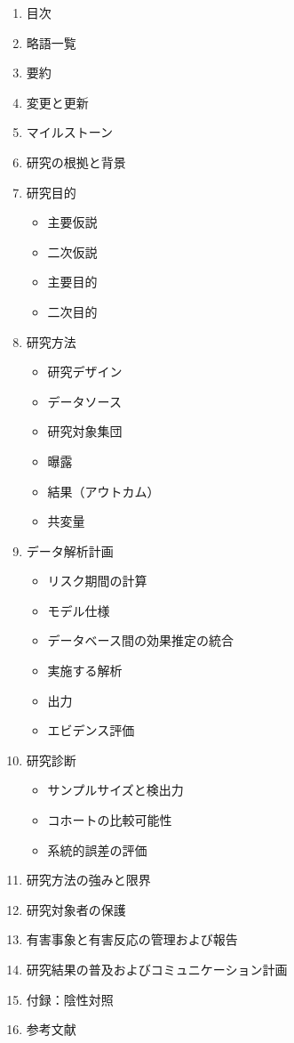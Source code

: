 \documentclass[
  11pt]{book}
\providecommand{\tightlist}{%
  \setlength{\itemsep}{0pt}\setlength{\parskip}{0pt}}
\theoremstyle{definition}
\theoremstyle{definition}
\theoremstyle{definition}
\theoremstyle{definition}
\theoremstyle{remark}
\begin{document}
\begin{enumerate}
\def\labelenumi{\arabic{enumi}.}
\tightlist
\item
  目次
\item
  略語一覧
\item
  要約
\item
  変更と更新
\item
  マイルストーン
\item
  研究の根拠と背景
\item
  研究目的

  \begin{itemize}
  \tightlist
  \item
    主要仮説
  \item
    二次仮説
  \item
    主要目的
  \item
    二次目的
  \end{itemize}
\item
  研究方法

  \begin{itemize}
  \tightlist
  \item
    研究デザイン
  \item
    データソース
  \item
    研究対象集団
  \item
    曝露
  \item
    結果（アウトカム）
  \item
    共変量
  \end{itemize}
\item
  データ解析計画

  \begin{itemize}
  \tightlist
  \item
    リスク期間の計算
  \item
    モデル仕様
  \item
    データベース間の効果推定の統合
  \item
    実施する解析
  \item
    出力
  \item
    エビデンス評価
  \end{itemize}
\item
  研究診断

  \begin{itemize}
  \tightlist
  \item
    サンプルサイズと検出力
  \item
    コホートの比較可能性
  \item
    系統的誤差の評価
  \end{itemize}
\item
  研究方法の強みと限界
\item
  研究対象者の保護
\item
  有害事象と有害反応の管理および報告
\item
  研究結果の普及およびコミュニケーション計画
\item
  付録：陰性対照
\item
  参考文献
\end{enumerate}
\end{document}
